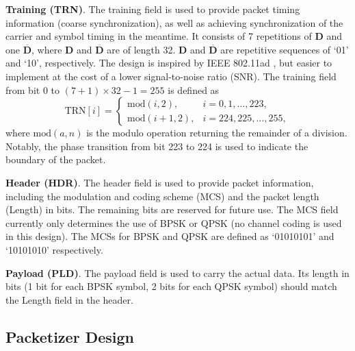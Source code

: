 \documentclass[journal,twoside]{IEEEtran}
\begin{document}
    \textbf{Training (TRN)}.
    The training field is used to provide packet timing information (coarse synchronization),
    as well as achieving synchronization of the carrier and symbol timing in the meantime.
    It consists of 7 repetitions of $\mathbf{D}$ and one $\overline{\mathbf{D}}$,
    where $\mathbf{D}$ and $\overline{\mathbf{D}}$ are of length 32.
    $\mathbf{D}$ and $\overline{\mathbf{D}}$ are repetitive sequences of `01' and `10', respectively.
    The design is inspired by IEEE 802.11ad \cite{IEEE802.11ad},
    but easier to implement at the cost of a lower signal-to-noise ratio (SNR).
    The training field from bit $0$ to $(7+1)\times32-1=255$ is defined as
    \begin{equation}
      \mathrm{TRN}[i]=\begin{cases}
        \mathrm{mod}(i,2), & i=0,1,\dots,223,\\
        \mathrm{mod}(i+1,2), & i=224,225,\dots,255,
      \end{cases}
    \end{equation}
    where $\mathrm{mod}(a,n)$ is the modulo operation returning the remainder of a division.
    Notably, the phase transition from bit 223 to 224 is used to indicate the boundary of the packet.

    \textbf{Header (HDR)}.
    The header field is used to provide packet information,
    including the modulation and coding scheme (MCS) and the packet length (Length) in bits.
    The remaining bits are reserved for future use.
    The MCS field currently only determines the use of BPSK or QPSK (no channel coding is used in this design).
    The MCSs for BPSK and QPSK are defined as `01010101' and `10101010' respectively.

    \textbf{Payload (PLD)}.
    The payload field is used to carry the actual data.
    Its length in bits (1 bit for each BPSK symbol, 2 bits for each QPSK symbol) should match the Length field in the header.

    \subsection{Packetizer Design}
\end{document}
